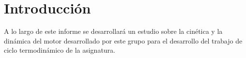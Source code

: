 \section{Introducción} \label{s:section_01}

A lo largo de este informe se desarrollará un estudio sobre la cinética y la dinámica del motor desarrollado por este grupo para el desarrollo del trabajo de ciclo termodinámico de la asignatura.